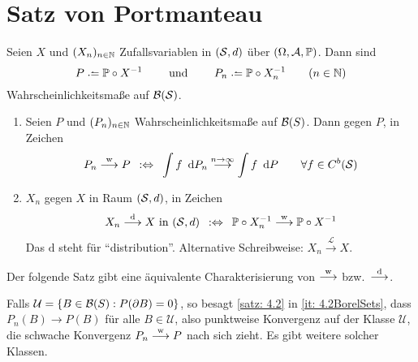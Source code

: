 
\section{Satz von Portmanteau}

Seien $X$ und $(X_n)_{n \in \N}$ Zufallsvariablen in $(\S,d)$ über $(\Omega,\A,\P)$.
Dann sind
\begin{equation*}
	P \defeq \P \circ X^{-1} \qquad \und \qquad P_n \defeq \P \circ X_n^{-1} \qquad (n \in \N)
\end{equation*}
Wahrscheinlichkeitsmaße auf $\B(\S)$.

\begin{definition} \label{definition: 4.1}
	\begin{enumerate}[label=(\arabic*)]
		\item \label{it: 4.1Pweak} Seien $P$ und $(P_n)_{n \in \N}$ Wahrscheinlichkeitsmaße auf $\B(S)$.
		Dann  gegen $P$, in Zeichen
		\begin{equation*}
			P_n \weakto P \defequiv \int f \diffskip{P_n} \ntoinf \int f \diffskip P \qquad \forall f \in C^b(\S)
		\end{equation*}
		\item \label{it: 4.1Xweak} $X_n$  gegen $X$ in Raum $(\S,d)$, in Zeichen
			\begin{align*}
				X_n \distto X \text{ in } (\S,d) \defequiv \P \circ X_n^{-1} \weakto \P \circ X^{-1}
			\end{align*}
			Das $\text{d}$ steht für \enquote{distribution}. Alternative Schreibweise: $X_n \overset{\mathcal{L}}{\longrightarrow} X$.
	\end{enumerate}
\end{definition}

Der folgende Satz gibt eine äquivalente Charakterisierung von $\weakto$ bzw.\ $\distto$.



Falls $\mathcal{U} = \menge{B \in \B(S) : P(\rand{B}) = 0}$, so besagt \cref{satz: 4.2} in \cref{it: 4.2BorelSets}, dass $P_n(B) \to P(B)$ für alle $B \in \mathcal{U}$, also punktweise Konvergenz auf der Klasse $\mathcal{U}$, die schwache Konvergenz $P_n \weakto P$ nach sich zieht.
Es gibt weitere solcher Klassen.

